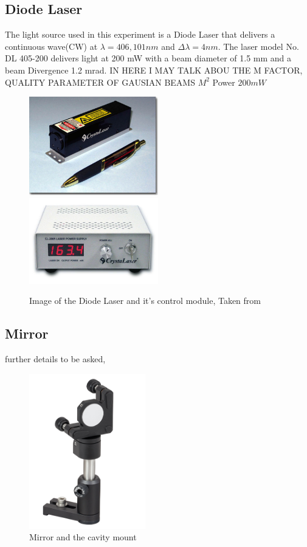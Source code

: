 \subsection{Diode Laser}
The light source used in this experiment is a Diode Laser that delivers a continuous wave(CW) at 
$\lambda = 406,101 nm$ and $\Delta \lambda = 4 nm$. The laser model No. DL 405-200 delivers light at 200 mW with a beam diameter of 1.5 mm and a beam Divergence 1.2 mrad. IN HERE I MAY TALK ABOU THE M FACTOR, QUALITY PARAMETER OF GAUSIAN BEAMS $M^2$ 
Power $200mW$
\begin{figure}[h!]
\centering
{  \includegraphics[width=0.5\textwidth]{Figures/diodeLaser.jpg} }
{  \includegraphics[width=0.5\textwidth]{Figures/diodeLaserControl.jpg} }
\caption{Image of the Diode Laser and it's control module, Taken from \cite{crystalLaser}}
 \label{fig:diodeLaser}
\end{figure}

\subsection{Mirror}
further details to be asked, 
\begin{figure}[h!]
\centering
\label{fig:mirror}
 \includegraphics[width=0.45\textwidth]{Figures/mirror.jpg}
 \caption{Mirror and the cavity mount} 
\end{figure}

